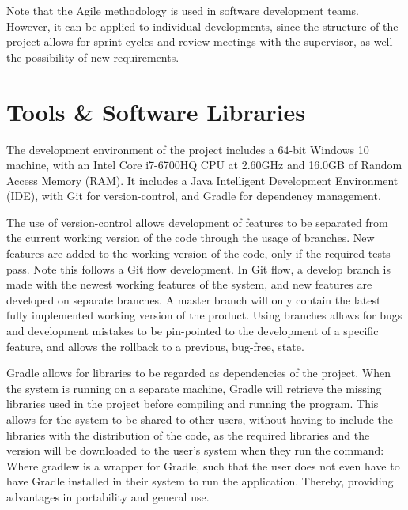 \par Note that the Agile methodology is used in software development teams. However,	 it can be applied to individual developments, since the structure of the project allows for sprint cycles and review meetings with the supervisor, as well the possibility of new requirements.

\section{Tools \& Software Libraries}
\par The development environment of the project includes a 64-bit Windows 10 machine, with an Intel Core i7-6700HQ CPU at 2.60GHz and 16.0GB of Random Access Memory (RAM). It includes a Java Intelligent Development Environment (IDE), with Git for version-control, and Gradle for dependency management. 

\par The use of version-control allows development of features to be separated from the current working version of the code through the usage of branches. New features are added to the working version of the code, only if the required tests pass. Note this follows a Git flow development. In Git flow, a develop branch is made with the newest working features of the system, and new features are developed on separate branches. A master branch will only contain the latest fully implemented working version of the product. Using branches allows for bugs and development mistakes to be pin-pointed to the development of a specific feature, and allows the rollback to a previous, bug-free, state.

\par Gradle allows for libraries to be regarded as dependencies of the project. When the system is running on a separate machine, Gradle will retrieve the missing libraries used in the project before compiling and running the program. This allows for the system to be shared to other users, without having to include the libraries with the distribution of the code, as the required libraries and the version will be downloaded to the user's system when they run the command:
Where gradlew is a wrapper for Gradle, such that the user does not even have to have Gradle installed in their system to run the application. Thereby, providing advantages in portability and general use.

